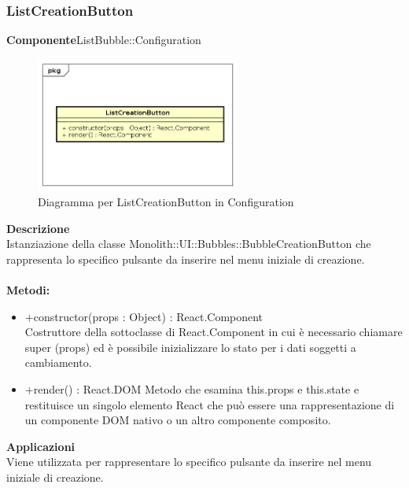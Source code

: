 \subsubsection{ListCreationButton}
\textbf{Componente}ListBubble::Configuration\\
   \FloatBarrier
   \begin{figure}[ht]
   \centering
   \includegraphics[width=0.6\textwidth]{img/single-ListCreationButton}
   \caption{{Diagramma per ListCreationButton in Configuration}}
\end{figure}
\FloatBarrier
\textbf{Descrizione}\\
Istanziazione della classe Monolith::UI::Bubbles::BubbleCreationButton che rappresenta lo specifico pulsante da inserire nel menu iniziale di creazione.
\\
\\
\textbf{Metodi:} 
\begin{itemize}
\item +constructor(props : Object) : React.Component 
\\
Costruttore della sottoclasse di React.Component in cui è necessario chiamare super (props) ed è possibile inizializzare lo stato per i dati soggetti a cambiamento.

\item +render() : React.DOM
Metodo che esamina this.props e this.state e restituisce un singolo elemento React che può essere una rappresentazione di un componente DOM nativo o un altro componente composito.

\end{itemize} 


\textbf{Applicazioni}\\
Viene utilizzata per rappresentare lo specifico pulsante da inserire nel menu iniziale di creazione. 


\clearpage

